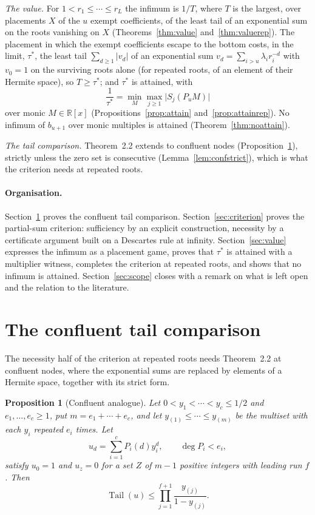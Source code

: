 \documentclass[11pt]{article}
\newtheorem{proposition}[theorem]{Proposition}
\theoremstyle{definition}
\theoremstyle{plain}
\newcommand{\R}{\mathbb R}
\DeclareMathOperator{\Tail}{Tail}
\begin{document}
\emph{The value.}  For $1<r_1\le\cdots\le r_L$ the infimum is $1/T$, where
$T$ is the largest, over placements $X$ of the $u$ exempt coefficients, of
the least tail of an exponential sum on the roots vanishing on $X$
(Theorems~\ref{thm:value} and~\ref{thm:valuerep}).  The placement in which
the exempt coefficients escape to the bottom costs, in the limit, $\tau^*$, the
least tail $\sum_{d\ge1}|v_d|$ of an exponential sum
$v_d=\sum_{i>u}\lambda_ir_i^{-d}$ with $v_0=1$ on the surviving roots alone
(for repeated roots, of an element of their Hermite space), so
$T\ge\tau^*$; and $\tau^*$ is attained, with
\[
  \frac1{\tau^*}=\min_M\max_{j\ge1}\bigl|S_j(P_uM)\bigr|
\]
over monic $M\in\R[x]$ (Propositions~\ref{prop:attain}
and~\ref{prop:attainrep}).  No infimum of $b_{u+1}$ over monic multiples is
attained (Theorem~\ref{thm:noattain}).

\emph{The tail comparison.}  Theorem~2.2 extends to confluent nodes
(Proposition~\ref{prop:confluent}), strictly unless the zero set is
consecutive (Lemma~\ref{lem:confstrict}), which is what the criterion needs
at repeated roots.

\paragraph{Organisation.}  Section~\ref{sec:extend} proves the confluent
tail comparison.  Section~\ref{sec:criterion} proves the partial-sum
criterion: sufficiency by an explicit construction, necessity by a
certificate argument built on a Descartes rule at infinity.
Section~\ref{sec:value} expresses the infimum as a placement game, proves
that $\tau^*$ is attained with a multiplier witness, completes the criterion
at repeated roots, and shows that no infimum is attained.
Section~\ref{sec:scope} closes with a remark on what is left open and the
relation to the literature.

\section{The confluent tail comparison}\label{sec:extend}

The necessity half of the criterion at repeated roots needs Theorem~2.2 at
confluent nodes, where the exponential sums are replaced by elements of a
Hermite space, together with its strict form.

\begin{proposition}[Confluent analogue]\label{prop:confluent}
Let $0<y_1<\cdots<y_c\le1/2$ and $e_1,\ldots,e_c\ge1$, put $m=e_1+\cdots+e_c$,
and let $y_{(1)}\le\cdots\le y_{(m)}$ be the multiset with each $y_i$ repeated
$e_i$ times.  Let
\[
  u_d=\sum_{i=1}^c P_i(d)y_i^d,\qquad \deg P_i<e_i,
\]
satisfy $u_0=1$ and $u_z=0$ for a set $Z$ of $m-1$ positive integers with
leading run $f$.  Then
\[
  \Tail(u)\le\prod_{j=1}^{f+1}\frac{y_{(j)}}{1-y_{(j)}}.
\]
\end{proposition}
\end{document}

